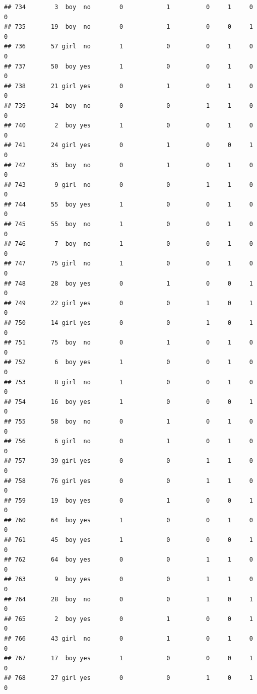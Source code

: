 \documentclass[man]{apa6}
\begin{document}
\begin{verbatim}
## 734        3  boy  no        0            1          0     1     0     0
## 735       19  boy  no        0            1          0     0     1     0
## 736       57 girl  no        1            0          0     1     0     0
## 737       50  boy yes        1            0          0     1     0     0
## 738       21 girl yes        0            1          0     1     0     0
## 739       34  boy  no        0            0          1     1     0     0
## 740        2  boy yes        1            0          0     1     0     0
## 741       24 girl yes        0            1          0     0     1     0
## 742       35  boy  no        0            1          0     1     0     0
## 743        9 girl  no        0            0          1     1     0     0
## 744       55  boy yes        1            0          0     1     0     0
## 745       55  boy  no        1            0          0     1     0     0
## 746        7  boy  no        1            0          0     1     0     0
## 747       75 girl  no        1            0          0     1     0     0
## 748       28  boy yes        0            1          0     0     1     0
## 749       22 girl yes        0            0          1     0     1     0
## 750       14 girl yes        0            0          1     0     1     0
## 751       75  boy  no        0            1          0     1     0     0
## 752        6  boy yes        1            0          0     1     0     0
## 753        8 girl  no        1            0          0     1     0     0
## 754       16  boy yes        1            0          0     0     1     0
## 755       58  boy  no        0            1          0     1     0     0
## 756        6 girl  no        0            1          0     1     0     0
## 757       39 girl yes        0            0          1     1     0     0
## 758       76 girl yes        0            0          1     1     0     0
## 759       19  boy yes        0            1          0     0     1     0
## 760       64  boy yes        1            0          0     1     0     0
## 761       45  boy yes        1            0          0     0     1     0
## 762       64  boy yes        0            0          1     1     0     0
## 763        9  boy yes        0            0          1     1     0     0
## 764       28  boy  no        0            0          1     0     1     0
## 765        2  boy yes        0            1          0     0     1     0
## 766       43 girl  no        0            1          0     1     0     0
## 767       17  boy yes        1            0          0     0     1     0
## 768       27 girl yes        0            0          1     0     1     0

\end{verbatim}
\end{document}
